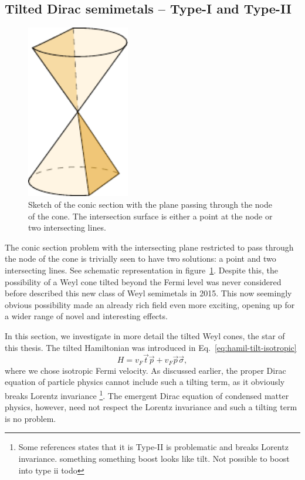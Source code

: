 \subsection{Tilted Dirac semimetals -- Type-I and Type-II}
\label{sec:typeii}

\begin{figure}[ht]
  \centering
  \includegraphics[width=0.4\textwidth]{figures/conicSection}
  \caption{Sketch of the conic section with the plane passing through the node of the cone. The intersection surface is either a point at the node or two intersecting lines. \label{fig:conic-section-sketch}}
\end{figure}

The conic section problem with the intersecting plane restricted to pass through the node of the cone is trivially seen to have two solutions: a point and two intersecting lines.
See schematic representation in figure~\ref{fig:conic-section-sketch}.
Despite this, the possibility of a Weyl cone tilted beyond the Fermi level was never considered before \textcite{soluyanovTypeIIWeylSemimetals2015} described this new class of Weyl semimetals in 2015.
This now seemingly obvious possibility made an already rich field even more exciting, opening up for a wider range of novel and interesting effects.

In this section, we investigate in more detail the tilted Weyl cones, the star of this thesis.
The tilted Hamiltonian was introduced in Eq.~\eqref{eq:hamil-tilt-isotropic}
\[
H = v_F \vec{t} \vec{p} + v_F \vec{p} \vec{\sigma},
\]
where we chose isotropic Fermi velocity.
As discussed earlier, the proper Dirac equation of particle physics cannot include such a tilting term, as it obviously breaks Lorentz invariance
\footnote{Some references states that it is Type-II is problematic and breaks Lorentz invariance.
  something something boost looks like tilt.
  Not possible to boost into type ii
todo}.
The emergent Dirac equation of condensed matter physics, however, need not respect the Lorentz invariance and such a tilting term is no problem.

